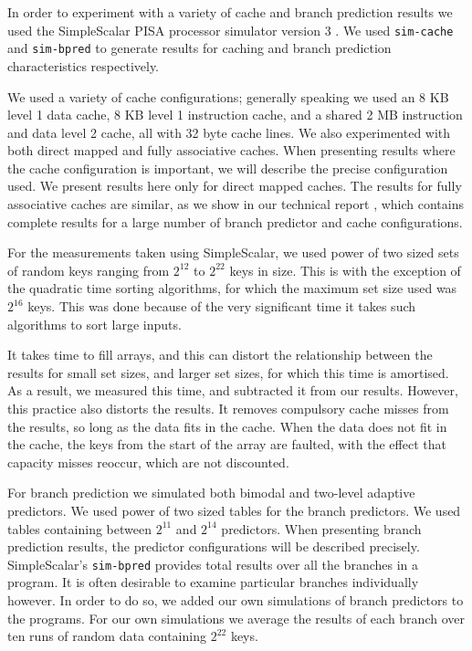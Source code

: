 \documentclass[acmtocl]{acmtrans2m}
\begin{document}
In order to experiment with a variety of cache and branch prediction results we
used the SimpleScalar PISA processor simulator version 3
\cite{SimpleScalarTutorialv4}.  We used \texttt{sim-cache} and
\texttt{sim-bpred} to generate results for caching and branch prediction
characteristics respectively.

We used a variety of cache configurations; generally speaking we used an 8 KB
level 1 data cache, 8 KB level 1 instruction cache, and a shared 2 MB
instruction and data level 2 cache, all with 32 byte cache lines.  We also
experimented with both direct mapped and fully associative caches. When
presenting results where the cache configuration is important, we will describe
the precise configuration used. We present results here only for direct mapped
caches. The results for fully associative caches are similar, as we show in our
technical report \cite{BiggarGregg05}, which contains complete results for a
large number of branch predictor and cache configurations. 

For the measurements taken using SimpleScalar, we used power of two sized sets
of random keys ranging from $2^{12}$ to $2^{22}$ keys in size.  This is with the
exception of the quadratic time sorting algorithms, for which the maximum set
size used was $2^{16}$ keys. This was done because of the very significant time
it takes such algorithms to sort large inputs.

It takes time to fill arrays, and this can distort the relationship between the
results for small set sizes, and larger set sizes, for which this time is
amortised. As a result, we measured this time, and subtracted it from our
results.  However, this practice also distorts the results. It removes
compulsory cache misses from the results, so long as the data fits in the cache.
When the data does not fit in the cache, the keys from the start of the array
are faulted, with the effect that capacity misses reoccur, which are not
discounted. 

For branch prediction we simulated both bimodal and two-level adaptive
predictors.  We used power of two sized tables for the branch predictors.  We
used tables containing between $2^{11}$ and $2^{14}$ predictors.  When
presenting branch prediction results, the predictor configurations will be
described precisely.  SimpleScalar's \texttt{sim-bpred} provides total results
over all the branches in a program. It is often desirable to examine particular
branches individually however.  In order to do so, we added our own simulations
of branch predictors to the programs. For our own simulations we average the
results of each branch over ten runs of random data containing $2^{22}$ keys.
\end{document}
